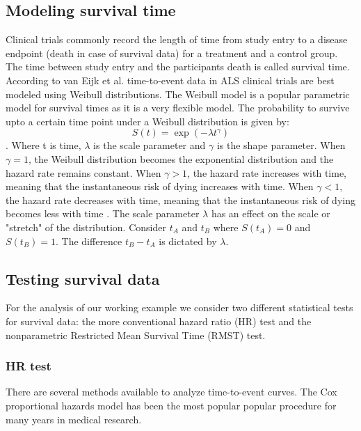 \documentclass[Royal,sagev,times]{sagej}
\begin{document}
\subsection{ Modeling survival time}
Clinical trials commonly record the length of time from study entry to a disease endpoint (death in case of survival data) for a treatment and a control group.\cite{spruance2004} The time between study entry and the participants death is called survival time.\cite{crumer2011} According to van Eijk et al. time-to-event data in ALS clinical trials are best modeled using Weibull distributions.\cite{van2019} The Weibull model is a popular parametric model for survival times as it is a very flexible model.\cite{crumer2011} The probability to survive upto a certain time point under a Weibull distribution is given by:
\begin{equation}\label{eq:Survival}
S(t)=\exp(-\lambda t^\gamma)
\end{equation}
.\cite{crumer2011}\cite{van2019}
Where t is time, $\lambda$ is the scale parameter and $\gamma$ is the shape parameter. When $\gamma = 1$, the Weibull distribution becomes the exponential distribution and the hazard rate remains constant.\cite{crumer2011} When $\gamma > 1$, the hazard rate increases with time, meaning that the instantaneous risk of dying increases with time.\cite{crumer2011} When $\gamma < 1$, the hazard rate decreases with time, meaning that the instantaneous risk of dying becomes less with time .\cite{crumer2011} The scale parameter $\lambda$ has an effect on the scale or "stretch" of the distribution. Consider $t_A$ and $t_B$ where $S(t_A) = 0$ and $S(t_B) = 1$. The difference $t_B - t_A$ is dictated by $\lambda$.

\subsection{Testing survival data}
For the analysis of our working example we consider two different statistical tests for survival data: the more conventional hazard ratio (HR) test and the nonparametric Restricted Mean Survival Time (RMST) test.

\subsubsection{HR test}
There are several methods available to analyze time-to-event curves.\cite{spruance2004} The Cox proportional hazards model has been the most popular popular procedure for many years in medical research.\cite{spruance2004}
\end{document}

